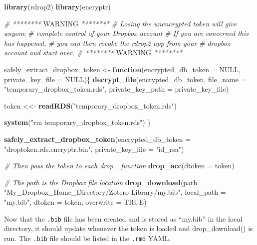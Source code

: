 \documentclass[]{book}
\newenvironment{Shaded}{\begin{snugshade}}{\end{snugshade}}
\newcommand{\AlertTok}[1]{\textcolor[rgb]{0.94,0.16,0.16}{#1}}
\newcommand{\CommentTok}[1]{\textcolor[rgb]{0.56,0.35,0.01}{\textit{#1}}}
\newcommand{\ControlFlowTok}[1]{\textcolor[rgb]{0.13,0.29,0.53}{\textbf{#1}}}
\newcommand{\DataTypeTok}[1]{\textcolor[rgb]{0.13,0.29,0.53}{#1}}
\newcommand{\KeywordTok}[1]{\textcolor[rgb]{0.13,0.29,0.53}{\textbf{#1}}}
\newcommand{\NormalTok}[1]{#1}
\newcommand{\OtherTok}[1]{\textcolor[rgb]{0.56,0.35,0.01}{#1}}
\newcommand{\StringTok}[1]{\textcolor[rgb]{0.31,0.60,0.02}{#1}}
\begin{document}
\begin{Shaded}
\begin{Highlighting}[]
\KeywordTok{library}\NormalTok{(rdrop2)}
\KeywordTok{library}\NormalTok{(encryptr)}
 
\CommentTok{# ******** }\AlertTok{WARNING}\CommentTok{ ********}
\CommentTok{# Losing the unencrypted token will give anyone }
\CommentTok{# complete control of your Dropbox account}
\CommentTok{# If you are concerned this has happened,}
\CommentTok{# you can then revoke the rdrop2 app from your}
\CommentTok{# dropbox account and start over.}
\CommentTok{# ******** }\AlertTok{WARNING}\CommentTok{ ********}
 
 
\NormalTok{safely_extract_dropbox_token <-}\StringTok{ }\ControlFlowTok{function}\NormalTok{(}\DataTypeTok{encrypted_db_token =} \OtherTok{NULL}\NormalTok{, }
                                         \DataTypeTok{private_key_file =} \OtherTok{NULL}\NormalTok{)\{}
  \KeywordTok{decrypt_file}\NormalTok{(encrypted_db_token, }
               \DataTypeTok{file_name =} \StringTok{"temporary_dropbox_token.rds"}\NormalTok{, }
               \DataTypeTok{private_key_path =}\NormalTok{ private_key_file)}
  
\NormalTok{  token <<-}\StringTok{ }\KeywordTok{readRDS}\NormalTok{(}\StringTok{"temporary_dropbox_token.rds"}\NormalTok{)}
  
  \KeywordTok{system}\NormalTok{(}\StringTok{"rm temporary_dropbox_token.rds"}\NormalTok{)}
\NormalTok{\}}
 
\KeywordTok{safely_extract_dropbox_token}\NormalTok{(}\DataTypeTok{encrypted_db_token =} \StringTok{"droptoken.rds.encryptr.bin"}\NormalTok{, }
                             \DataTypeTok{private_key_file =} \StringTok{"id_rsa"}\NormalTok{)}
 
\CommentTok{# Then pass the token to each drop_ function}
\KeywordTok{drop_acc}\NormalTok{(}\DataTypeTok{dtoken =}\NormalTok{ token)}
 
\CommentTok{# The path is the Dropbox file location}
\KeywordTok{drop_download}\NormalTok{(}\DataTypeTok{path =} \StringTok{"My_Dropbox_Home_Directory/Zotero Library/my.bib"}\NormalTok{, }
              \DataTypeTok{local_path =} \StringTok{"my.bib"}\NormalTok{, }
              \DataTypeTok{dtoken =}\NormalTok{ token,}
              \DataTypeTok{overwrite =} \OtherTok{TRUE}\NormalTok{)}
\end{Highlighting}
\end{Shaded}

Now that the \texttt{.bib} file has been created and is stored as ``my.bib'' in the local directory, it should update whenever the token is loaded and drop\_download() is run. The \texttt{.bib} file should be listed in the \texttt{.rmd} YAML.
\end{document}
